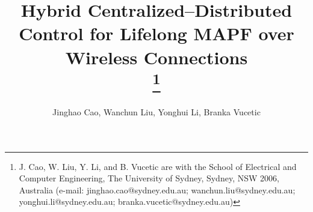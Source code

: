 \documentclass[conference]{IEEEtran}
\begin{document}
\title{Hybrid Centralized–Distributed Control for Lifelong MAPF over Wireless Connections\\

\thanks{J. Cao, W. Liu, Y. Li, and B. Vucetic are with the School of Electrical and
Computer Engineering, The University of Sydney, Sydney, NSW 2006,
Australia (e-mail: jinghao.cao@sydney.edu.au; wanchun.liu@sydney.edu.au; yonghui.li@sydney.edu.au; branka.vucetic@sydney.edu.au)}
}

\author{Jinghao Cao, Wanchun Liu, Yonghui Li, Branka Vucetic}

\maketitle

\begin{abstract}

\end{abstract}
\end{document}
